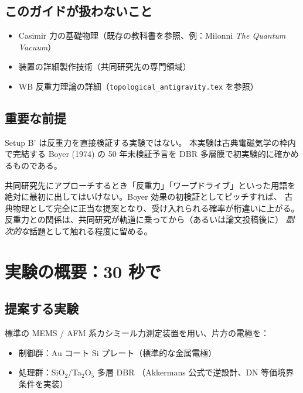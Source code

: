 \documentclass[11pt,a4paper]{article}
\def\textbf#1{#1}%
\begin{document}
\subsection{このガイドが扱わないこと}

\begin{itemize}
\item Casimir 力の基礎物理（既存の教科書を参照、例：Milonni \emph{The Quantum Vacuum}）
\item 装置の詳細製作技術（共同研究先の専門領域）
\item WB 反重力理論の詳細（\texttt{topological\_antigravity.tex} を参照）
\end{itemize}

\subsection{重要な前提}

\textbf{Setup B' は反重力を直接検証する実験ではない}。
本実験は古典電磁気学の枠内で完結する Boyer (1974) の 50 年未検証予言を
DBR 多層膜で初実験的に確かめるものである。

\begin{tipbox}
共同研究先にアプローチするとき「反重力」「ワープドライブ」といった用語を
\textbf{絶対に最初に出してはいけない}。Boyer 効果の初検証としてピッチすれば、
古典物理として完全に正当な提案となり、受け入れられる確率が桁違いに上がる。
反重力との関係は、共同研究が軌道に乗ってから（あるいは論文投稿後に）
\emph{副次的な}話題として触れる程度に留める。
\end{tipbox}

\newpage

\section{実験の概要：30 秒で}

\subsection{提案する実験}

標準の MEMS / AFM 系カシミール力測定装置を用い、片方の電極を：

\begin{itemize}
\item \textbf{制御群}：Au コート Si プレート（標準的な金属電極）
\item \textbf{処理群}：SiO$_2$/Ta$_2$O$_5$ 多層 DBR
  （Akkermans 公式で逆設計、DN 等価境界条件を実装）
\end{itemize}
\end{document}
